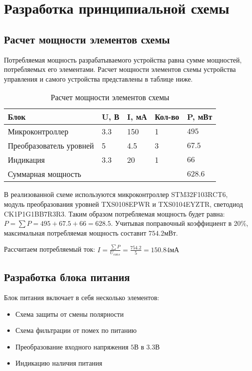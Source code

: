 \section{Разработка принципиальной схемы}
\label{sec:principal}

\subsection{Расчет мощности элементов схемы}
Потребляемая мощность разрабатываемого устройства равна сумме мощностей, потребляемых его элементами. Расчет мощности элементов схемы устройства управления и самого устройства представлены в таблице ниже.

\begin{table}[ht]
    \caption{Расчет мощности элементов схемы}
    \label{table:power_calc}
    \begin{tabular}{|llll|l|}
        \hline
        \multicolumn{1}{|l|}{Блок}                    & \multicolumn{1}{l|}{U, В} & \multicolumn{1}{l|}{I, мА} & Кол-во & P, мВт  \\ \hline
        \multicolumn{1}{|l|}{Микроконтроллер}         & \multicolumn{1}{l|}{3.3}  & \multicolumn{1}{l|}{150}   & 1      & $495$   \\ \hline
        \multicolumn{1}{|l|}{Преобразователь уровней} & \multicolumn{1}{l|}{5}    & \multicolumn{1}{l|}{4.5}   & 3      & $67.5$  \\ \hline
        \multicolumn{1}{|l|}{Индикация}               & \multicolumn{1}{l|}{3.3}  & \multicolumn{1}{l|}{20}    & 1      & $66$    \\ \hline
        \multicolumn{4}{|l|}{Суммарная мощность}                                                                        & $628.6$ \\ \hline
    \end{tabular}
\end{table}

В реализованной схеме используются микроконтроллер STM32F103RCT6, модуль преобразования уровней TXS0108EPWR и TXS0104EYZTR, светодиод CK1P1G1BB7R3R3. Таким образом потребляемая мощность будет равна: \(P = \sum P = 495 + 67.5 + 66 = 628.5\). Учитывая поправочный коэффициент в 20\%, максимальная потребляемая мощность составит \(754.2 мВт\).

Рассчитаем потребляемый ток:
\(I=\frac{\sum P}{U_{cons}}=\frac{754.2}{5}=150.84 мА\)

\subsection{Разработка блока питания}
Блок питания включает в себя несколько элементов:
\begin{itemize}
    \item Схема защиты от смены полярности
    \item Схема фильтрации от помех по питанию
    \item Преобразование входного напряжения $5В$ в $3.3В$
    \item Индикацию наличия питания
\end{itemize}

